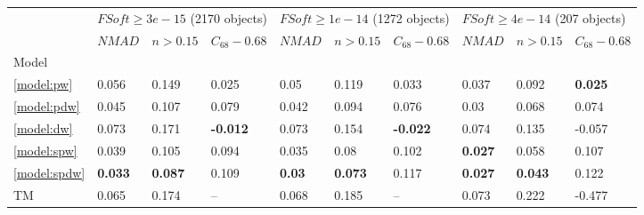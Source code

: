 \documentclass[fleqn,usenatbib]{mnras}
\begin{document}
\begin{table}
	\begin{tabular}{llllllllll}
            \hline
            {} & \multicolumn{3}{l}{$FSoft \geq 3e-15$ (2170 objects)} & \multicolumn{3}{l}{$FSoft \geq 1e-14$ (1272 objects)} & \multicolumn{3}{l}{$FSoft \geq 4e-14$ (207 objects)} \\
            {} &                            $NMAD$ &        $n>0.15$ &  $C_{68} - 0.68$ &                            $NMAD$ &        $n>0.15$ &  $C_{68} - 0.68$ &                           $NMAD$ &        $n>0.15$ & $C_{68} - 0.68$ \\
            Model          &                                   &                 &                  &                                   &                 &                  &                                  &                 &                 \\
            \hline
            \ref{model:pw}             &                             0.056 &           0.149 &            0.025 &                              0.05 &           0.119 &            0.033 &                            0.037 &           0.092 &  \textbf{0.025} \\
            \ref{model:pdw}            &                             0.045 &           0.107 &            0.079 &                             0.042 &           0.094 &            0.076 &                             0.03 &           0.068 &           0.074 \\
            \ref{model:dw}             &                             0.073 &           0.171 &  \textbf{-0.012} &                             0.073 &           0.154 &  \textbf{-0.022} &                            0.074 &           0.135 &          -0.057 \\
            \ref{model:spw}            &                             0.039 &           0.105 &            0.094 &                             0.035 &            0.08 &            0.102 &                   \textbf{0.027} &           0.058 &           0.107 \\
            \ref{model:spdw}           &                    \textbf{0.033} &  \textbf{0.087} &            0.109 &                     \textbf{0.03} &  \textbf{0.073} &            0.117 &                   \textbf{0.027} &  \textbf{0.043} &           0.122 \\
            TM &                             0.065 &           0.174 &           -- &                             0.068 &           0.185 &            -- &                            0.073 &           0.222 &          -0.477 \\

\end{tabular}
\end{table}
\end{document}
